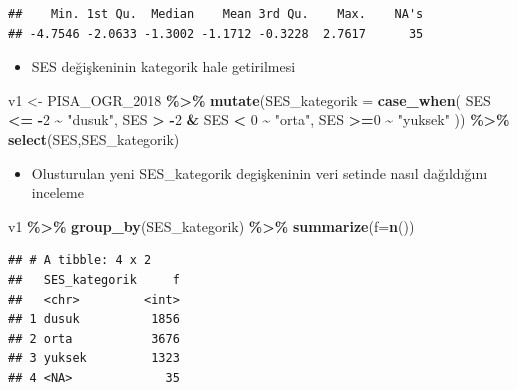 \documentclass[
  oneside]{book}
\newenvironment{Shaded}{\begin{snugshade}}{\end{snugshade}}
\newcommand{\AttributeTok}[1]{\textcolor[rgb]{0.13,0.29,0.53}{#1}}
\newcommand{\DecValTok}[1]{\textcolor[rgb]{0.00,0.00,0.81}{#1}}
\newcommand{\FunctionTok}[1]{\textcolor[rgb]{0.13,0.29,0.53}{\textbf{#1}}}
\newcommand{\NormalTok}[1]{#1}
\newcommand{\OtherTok}[1]{\textcolor[rgb]{0.56,0.35,0.01}{#1}}
\newcommand{\SpecialCharTok}[1]{\textcolor[rgb]{0.81,0.36,0.00}{\textbf{#1}}}
\newcommand{\StringTok}[1]{\textcolor[rgb]{0.31,0.60,0.02}{#1}}
\providecommand{\tightlist}{%
  \setlength{\itemsep}{0pt}\setlength{\parskip}{0pt}}
\begin{document}
\begin{verbatim}
##    Min. 1st Qu.  Median    Mean 3rd Qu.    Max.    NA's 
## -4.7546 -2.0633 -1.3002 -1.1712 -0.3228  2.7617      35
\end{verbatim}

\begin{itemize}
\tightlist
\item
  SES değişkeninin kategorik hale getirilmesi
\end{itemize}

\begin{Shaded}
\begin{Highlighting}[]
\NormalTok{v1 }\OtherTok{\textless{}{-}}\NormalTok{ PISA\_OGR\_2018 }\SpecialCharTok{\%\textgreater{}\%}
  \FunctionTok{mutate}\NormalTok{(}\AttributeTok{SES\_kategorik =}
    \FunctionTok{case\_when}\NormalTok{(}
\NormalTok{      SES }\SpecialCharTok{\textless{}=}  \SpecialCharTok{{-}}\DecValTok{2} \SpecialCharTok{\textasciitilde{}} \StringTok{"dusuk"}\NormalTok{,}
\NormalTok{      SES }\SpecialCharTok{\textgreater{}} \SpecialCharTok{{-}}\DecValTok{2} \SpecialCharTok{\&}\NormalTok{ SES }\SpecialCharTok{\textless{}}  \DecValTok{0} \SpecialCharTok{\textasciitilde{}} \StringTok{"orta"}\NormalTok{,}
\NormalTok{      SES }\SpecialCharTok{\textgreater{}=}\DecValTok{0} \SpecialCharTok{\textasciitilde{}} \StringTok{"yuksek"}\NormalTok{ )) }\SpecialCharTok{\%\textgreater{}\%}
      \FunctionTok{select}\NormalTok{(SES,SES\_kategorik)}
\end{Highlighting}
\end{Shaded}

\begin{itemize}
\tightlist
\item
  Olusturulan yeni SES\_kategorik degişkeninin veri setinde nasıl dağıldığını inceleme
\end{itemize}

\begin{Shaded}
\begin{Highlighting}[]
\NormalTok{v1 }\SpecialCharTok{\%\textgreater{}\%} \FunctionTok{group\_by}\NormalTok{(SES\_kategorik) }\SpecialCharTok{\%\textgreater{}\%} \FunctionTok{summarize}\NormalTok{(}\AttributeTok{f=}\FunctionTok{n}\NormalTok{())}
\end{Highlighting}
\end{Shaded}

\begin{verbatim}
## # A tibble: 4 x 2
##   SES_kategorik     f
##   <chr>         <int>
## 1 dusuk          1856
## 2 orta           3676
## 3 yuksek         1323
## 4 <NA>             35
\end{verbatim}
\end{document}
